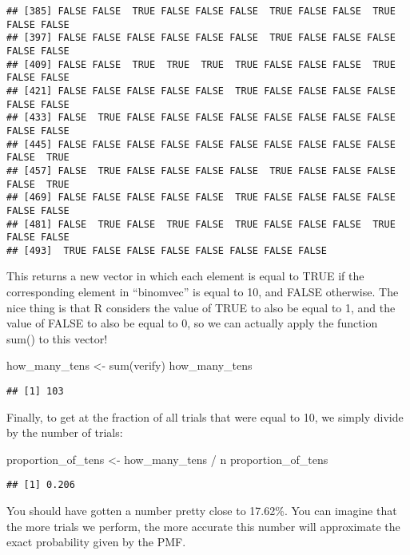 \documentclass[
]{book}
\newenvironment{Shaded}{\begin{snugshade}}{\end{snugshade}}
\newcommand{\FunctionTok}[1]{\textcolor[rgb]{0.00,0.00,0.00}{#1}}
\newcommand{\NormalTok}[1]{#1}
\newcommand{\OtherTok}[1]{\textcolor[rgb]{0.56,0.35,0.01}{#1}}
\newcommand{\SpecialCharTok}[1]{\textcolor[rgb]{0.00,0.00,0.00}{#1}}
\begin{document}
\begin{verbatim}
## [385] FALSE FALSE  TRUE FALSE FALSE FALSE  TRUE FALSE FALSE  TRUE FALSE FALSE
## [397] FALSE FALSE FALSE FALSE FALSE FALSE  TRUE FALSE FALSE FALSE FALSE FALSE
## [409] FALSE FALSE  TRUE  TRUE  TRUE  TRUE FALSE FALSE FALSE  TRUE FALSE FALSE
## [421] FALSE FALSE FALSE FALSE FALSE  TRUE FALSE FALSE FALSE FALSE FALSE FALSE
## [433] FALSE  TRUE FALSE FALSE FALSE FALSE FALSE FALSE FALSE FALSE FALSE FALSE
## [445] FALSE FALSE FALSE FALSE FALSE FALSE FALSE FALSE FALSE FALSE FALSE  TRUE
## [457] FALSE  TRUE FALSE FALSE FALSE FALSE  TRUE FALSE FALSE FALSE FALSE  TRUE
## [469] FALSE FALSE FALSE FALSE FALSE  TRUE FALSE FALSE FALSE FALSE FALSE FALSE
## [481] FALSE  TRUE FALSE  TRUE FALSE  TRUE FALSE FALSE FALSE  TRUE FALSE FALSE
## [493]  TRUE FALSE FALSE FALSE FALSE FALSE FALSE FALSE
\end{verbatim}

This returns a new vector in which each element is equal to TRUE if the corresponding element in ``binomvec'' is equal to 10, and FALSE otherwise. The nice thing is that R considers the value of TRUE to also be equal to 1, and the value of FALSE to also be equal to 0, so we can actually apply the function sum() to this vector!

\begin{Shaded}
\begin{Highlighting}[]
\NormalTok{how\_many\_tens }\OtherTok{\textless{}{-}} \FunctionTok{sum}\NormalTok{(verify)}
\NormalTok{how\_many\_tens}
\end{Highlighting}
\end{Shaded}

\begin{verbatim}
## [1] 103
\end{verbatim}

Finally, to get at the fraction of all trials that were equal to 10, we simply divide by the number of trials:

\begin{Shaded}
\begin{Highlighting}[]
\NormalTok{proportion\_of\_tens }\OtherTok{\textless{}{-}}\NormalTok{ how\_many\_tens }\SpecialCharTok{/}\NormalTok{ n}
\NormalTok{proportion\_of\_tens}
\end{Highlighting}
\end{Shaded}

\begin{verbatim}
## [1] 0.206
\end{verbatim}

You should have gotten a number pretty close to 17.62\%. You can imagine that the more trials we perform, the more accurate this number will approximate the exact probability given by the PMF.
\end{document}
